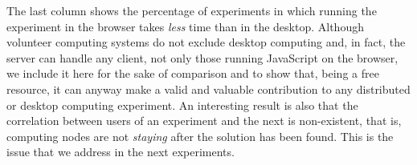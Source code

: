 \documentclass{sig-alternate}
\begin{document}
The last column shows the percentage of experiments in which running the
experiment in the browser takes {\em less} time than in the
desktop. Although volunteer computing systems do not exclude desktop
computing and, in fact, the server can handle any client, not only
those running JavaScript on the browser, we include it here for the
sake of comparison and to show that, being a free resource, it can
anyway make a valid and valuable contribution to any distributed or
desktop computing experiment. An interesting result is also that the
correlation between users of an experiment and the next is
non-existent, that is, computing nodes are not {\em
  staying} after the solution has been found. This is the issue that we
address in the next experiments. 

%
\end{document}
